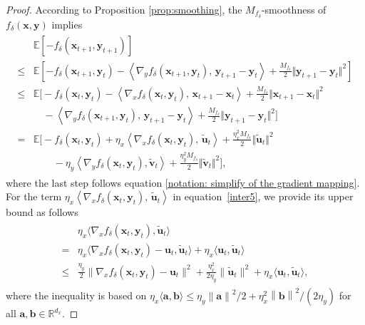 \documentclass[11pt]{article}
\def\va{\mathbf{a}}
\def\vb{\mathbf{b}}
\def\vu{\mathbf{u}}
\def\vv{\mathbf{v}}
\def\vx{\mathbf{x}}
\def\vy{\mathbf{y}}
\def\BE{{\mathbb{E}}}
\def\BR{{\mathbb{R}}}
\newcommand{\norm}[1]{\left\| #1 \right\|}
\begin{document}
\begin{proof}
According to Proposition \ref{prop:smoothing}, the $M_{f_\delta}$-smoothness of $f_{\delta}(\vx,\vy)$ implies
\begin{align}\label{inter5}
\begin{split}
& \BE \left[- f_{\delta}(  \vx_{t+1}, \mathbf{y}_{t+1} )\right]\\
\leq &
\mathbb{E}\left[ -f_{\delta}(  \vx_{t+1}, \mathbf{y}_t ) 
- \left\langle \nabla_y f_{\delta}(  \vx_{t+1},\mathbf{y}_t ),\, \mathbf{y}_{t+1}  - \mathbf{y}_t \right\rangle
+ \frac{M_{f_\delta}}{2} \Vert \mathbf{y}_{t+1}  -  \mathbf{y}_t  \Vert^2 \right] \\
\leq& 
\mathbb{E} \bigg[ - f_{\delta}(  \vx_t,\mathbf{y}_t ) 
-  \left\langle \nabla_x f_{\delta}(  \vx_t,\mathbf{y}_t ),\,  \vx_{t+1} -   \vx_t \right\rangle
+ \frac{M_{f_\delta}}{2} \Vert   \vx_{t+1} -   \vx_t \Vert^2 \\
&\quad 
- \left\langle \nabla_y f_{\delta}(  \vx_{t+1},\mathbf{y}_t ),\, \mathbf{y}_{t+1}  - \mathbf{y}_t \right\rangle
+ \frac{M_{f_\delta}}{2} \Vert \mathbf{y}_{t+1}  - \mathbf{y}_t  \Vert^2\bigg] \\
=& \mathbb{E} \bigg[- f_{\delta}(  \vx_t,  \vy_t)
+  \eta_x\left\langle \nabla_x f_{\delta}(  \vx_t,\mathbf{y}_t ),\,  \tilde{\vu}_t \right\rangle
+ \frac{\eta_x^2 M_{f_\delta}}{2} \Vert    \tilde{\vu}_t  \Vert^2  \\&\quad\quad
-\eta_y \left\langle \nabla_y f_{\delta}(  \vx_t, \mathbf{y}_t ),  \tilde{\vv}_t  \right\rangle
+ \frac{\eta_y^2 M_{f_\delta}}{2} \Vert  \tilde{\vv}_t   \Vert^2
\bigg],
\end{split}
\end{align}
where the last step follows equation \eqref{notation: simplify of the gradient mapping}.
For the term $\eta_x\left\langle \nabla_x f_{\delta}(  \vx_t,\mathbf{y}_t ),\,  \tilde{\vu}_t \right\rangle$ in equation~\eqref{inter5}, we provide its upper bound as follows
\begin{align}
\label{inter6}
\begin{split}
     &\eta_x\langle\nabla_x f_{\delta}(  \vx_t,\mathbf{y}_t ), \tilde{\vu}_t\rangle \\
     =&\eta_x\langle\nabla_x f_{\delta}(  \vx_t,\mathbf{y}_t)-\vu_t,\tilde{\vu}_t\rangle+\eta_x\langle\vu_t,\tilde{\vu}_t\rangle\\
     \le&\frac{\eta_y}{2}\|\nabla_x f_{\delta}(  \vx_t,\mathbf{y}_t )-\vu_t\|^2+\frac{\eta_x^2}{2\eta_y}\|\tilde{\vu}_t\|^2+\eta_x\langle\vu_t,\tilde{\vu}_t\rangle,
\end{split}
\end{align}
where the inequality is based on $ \eta_x\langle \va,\vb\rangle \leq \eta_y\norm{\va}^2/2 + \eta_x^2\norm{\vb}^2/(2\eta_y)$ for all $\va,\vb\in\BR^{d_x}$. 


\end{proof}
\end{document}
